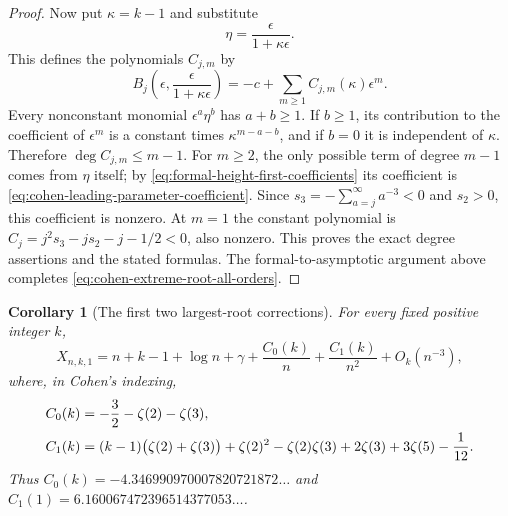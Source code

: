 \documentclass[11pt]{article}
\numberwithin{equation}{section}
\newtheorem{corollary}[theorem]{Corollary}
\theoremstyle{definition}
\theoremstyle{remark}
\begin{document}
\begin{proof}
Now put $\kappa=k-1$ and substitute
\begin{equation}\label{eq:two-small-parameter-substitution}
 \eta=\frac{\epsilon}{1+\kappa\epsilon}.
\end{equation}
This defines the polynomials $C_{j,m}$ by
\begin{equation}\label{eq:Cjm-coefficient-recipe}
 B_j\left(\epsilon,\frac{\epsilon}{1+\kappa\epsilon}\right)
       =-c+\sum_{m\geq1}C_{j,m}(\kappa)\epsilon^m.
\end{equation}
Every nonconstant monomial $\epsilon^a\eta^b$ has $a+b\geq1$.
If $b\geq1$, its contribution to the coefficient of $\epsilon^m$
is a constant times $\kappa^{m-a-b}$, and if $b=0$ it is
independent of $\kappa$.  Therefore $\deg C_{j,m}\leq m-1$.
For $m\geq2$, the only possible term of degree $m-1$ comes from
$\eta$ itself; by \eqref{eq:formal-height-first-coefficients} its
coefficient is \eqref{eq:cohen-leading-parameter-coefficient}.
Since $s_3=-\sum_{a=j}^{\infty}a^{-3}<0$ and $s_2>0$, this
coefficient is nonzero.  At $m=1$ the constant polynomial is
$C_j=j^2s_3-js_2-j-1/2<0$, also nonzero.  This proves the exact
degree assertions and the stated formulas.  The formal-to-asymptotic
argument above completes \eqref{eq:cohen-extreme-root-all-orders}.
\end{proof}

\begin{corollary}[The first two largest-root corrections]
\label{cor:cohen-two-constants}
For every fixed positive integer $k$,
\begin{equation}\label{eq:cohen-two-corrections}
 X_{n,k,1}=n+k-1+\log n+\gamma
     +\frac{C_0(k)}n+\frac{C_1(k)}{n^2}+O_k(n^{-3}),
\end{equation}
where, in Cohen's indexing,
\begin{align}\label{eq:cohen-exact-constants}
 C_0(k)&=-\frac32-\zeta(2)-\zeta(3),\\
 C_1(k)&=(k-1)\bigl(\zeta(2)+\zeta(3)\bigr)
       +\zeta(2)^2-\zeta(2)\zeta(3)+2\zeta(3)+3\zeta(5)-\frac1{12}.
       \notag
\end{align}
Thus $C_0(k)=-4.346990970007820721872\ldots$ and
$C_1(1)=6.160067472396514377053\ldots$.
\end{corollary}
\end{document}
